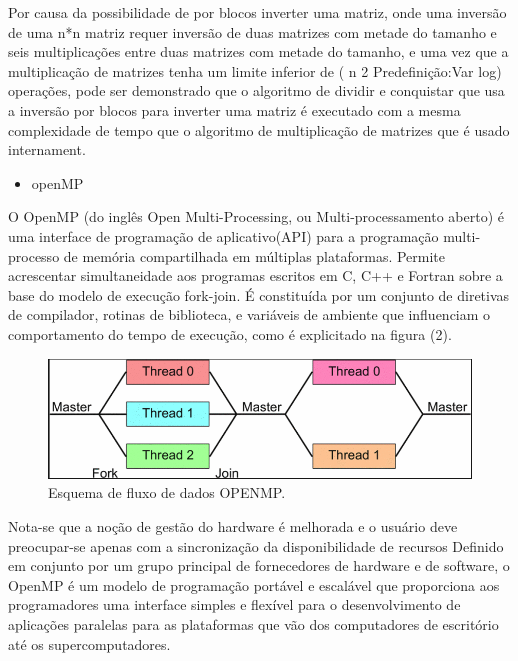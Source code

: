 \documentclass[letterpaper, 10 pt, conference]{ieeeconf}
\begin{document}
Por causa da possibilidade de por blocos inverter uma matriz, onde uma inversão de uma n*n 
matriz requer inversão de duas
matrizes com metade do tamanho e seis multiplicações entre duas matrizes com metade do 
tamanho, e uma vez que a 
multiplicação de matrizes tenha um limite inferior de \Ω ( n 2 Predefinição:Var log) 
operações, pode ser demonstrado que o 
algoritmo de dividir e conquistar que usa a inversão por blocos para inverter uma matriz é 
executado com a mesma 
complexidade de tempo que o algoritmo de multiplicação de matrizes que é usado internament.

\begin{itemize}
    \item openMP
\end{itemize}
O OpenMP (do inglês Open Multi-Processing, ou Multi-processamento aberto) é uma interface 
de programação de aplicativo(API)
para a programação multi-processo de memória compartilhada em múltiplas plataformas. 
Permite acrescentar simultaneidade aos
programas escritos em C, C++ e Fortran sobre a base do modelo de execução fork-join.
É constituída por um conjunto de diretivas de compilador, rotinas de biblioteca, e 
variáveis de ambiente que influenciam o 
comportamento do tempo de execução, como é explicitado na figura (2).
\begin{figure}[htbp]
\centering
\includegraphics[width=0.97\columnwidth]{Figuras/img2.png}
\caption{Esquema de fluxo de dados OPENMP.}
\label{stability}
\end{figure}
Nota-se que a noção de gestão do hardware é melhorada e o usuário deve preocupar-se apenas com a sincronização da disponibilidade de recursos 
Definido em conjunto por um grupo principal de fornecedores de hardware e de software, o OpenMP é um modelo de programação portável e escalável que proporciona aos programadores 
uma interface simples e flexível para o desenvolvimento de aplicações paralelas para as plataformas que vão dos computadores de escritório até os supercomputadores. 
\end{document}
